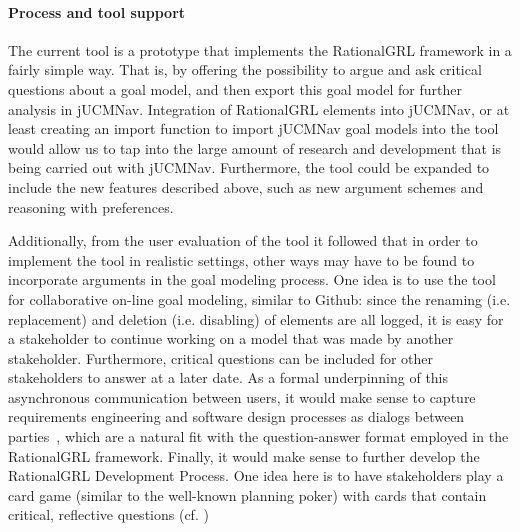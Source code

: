 \paragraph{Process and tool support}
The current tool is a prototype that implements the RationalGRL framework in a fairly simple way. That is, by offering the possibility to argue and ask critical questions about a goal model, and then export this goal model for further analysis in jUCMNav. Integration of RationalGRL elements into jUCMNav, or at least creating an import function to import jUCMNav goal models into the tool would allow us to tap into the large amount of research and development that is being carried out with jUCMNav. Furthermore, the tool could be expanded to include the new features described above, such as new argument schemes and reasoning with preferences. 

Additionally, from the user evaluation of the tool it followed that in order to implement the tool in realistic settings, other ways may have to be found to incorporate arguments in the goal modeling process. One idea is to use the tool for collaborative on-line goal modeling, similar to Github: since the renaming (i.e. replacement) and deletion (i.e. disabling) of elements are all logged, it is easy for a stakeholder to continue working on a model that was made by another stakeholder. Furthermore, critical questions can be included for other stakeholders to answer at a later date. As a formal underpinning of this asynchronous communication between users, it would make sense to capture requirements engineering and software design processes as dialogs between parties~\cite{finkelstein1989multiparty,BlackEtal2013}, which are a natural fit with the question-answer format employed in the RationalGRL framework. Finally, it would make sense to further develop the RationalGRL Development Process. One idea here is to have stakeholders play a card game (similar to the well-known planning poker) with cards that contain critical, reflective questions (cf. \cite{SchriekEtal2016})

